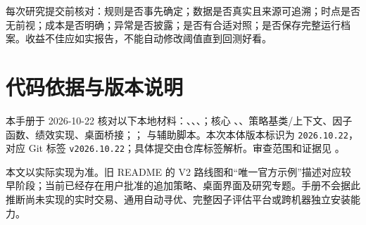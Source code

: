 \documentclass[UTF8,fontset=none,11pt]{ctexart}
\newcommand{\code}[1]{\nolinkurl{#1}}
\let\originalsection\section
\renewcommand{\section}{\Needspace{9\baselineskip}\originalsection}
\begin{document}
每次研究提交前核对：规则是否事先确定；数据是否真实且来源可追溯；时点是否无前视；成本是否明确；异常是否披露；是否有合适对照；是否保存完整运行档案。收益不佳应如实报告，不能自动修改阈值直到回测好看。

\appendix
\section{代码依据与版本说明}
本手册于 2026-10-22 核对以下本地材料：、、、；核心 、、策略基类/上下文、因子函数、绩效实现、桌面桥接；； 与辅助脚本。本次本体版本标识为 \code{2026.10.22}，对应 Git 标签 \code{v2026.10.22}；具体提交由仓库标签解析。审查范围和证据见 。

本文以实际实现为准。旧 README 的 V2 路线图和“唯一官方示例”描述对应较早阶段；当前已经存在用户批准的追加策略、桌面界面及研究专题。手册不会据此推断尚未实现的实时交易、通用自动寻优、完整因子评估平台或跨机器独立安装能力。
\end{document}
